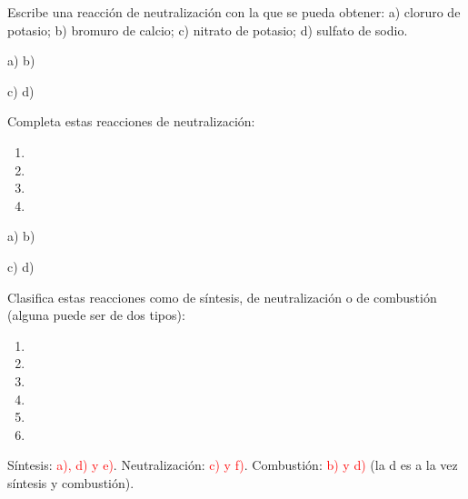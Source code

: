\begin{exercise}
    Escribe una reacción de neutralización con la que se pueda obtener: a) cloruro de potasio; b) bromuro de calcio; c) nitrato de potasio; d) sulfato de sodio.
    \begin{solu}
        a) 
        \quad b) 

        c) 
        \quad d) 
    \end{solu}
\end{exercise}

\begin{exercise}
    Completa estas reacciones de neutralización:
    \begin{enumerate}[label=\alph*)]
        \item {}
        \item {}
        \item {}
        \item {}
    \end{enumerate}
    \begin{solu}
        a) 
        \quad b) 

        c) 
        \quad d) 
    \end{solu}
\end{exercise}

\begin{exercise}
    Clasifica estas reacciones como de síntesis, de neutralización o de combustión (alguna puede ser de dos tipos):
    \begin{enumerate}[label=\alph*)]
        \item {}
        \item {}
        \item {}
        \item {}
        \item {}
        \item {}
    \end{enumerate}
    \begin{solu}
        Síntesis: \textcolor{red}{a), d) y e)}. Neutralización: \textcolor{red}{c) y f)}. Combustión: \textcolor{red}{b) y d)} (la d es a la vez síntesis y combustión).
    \end{solu}
\end{exercise}

